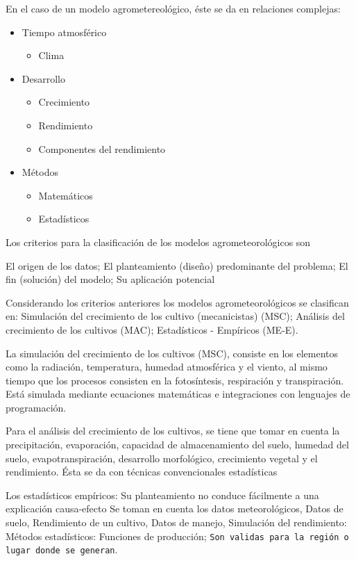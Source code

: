 En el caso de un modelo agrometereológico, éste se da en relaciones complejas:
\begin{itemize}
  \item Tiempo atmosférico \begin{itemize}
    \item Clima
  \end{itemize}
  \item Desarrollo \begin{itemize}
    \item Crecimiento
    \item Rendimiento
    \item Componentes del rendimiento
  \end{itemize}
  \item Métodos\begin{itemize}
    \item Matemáticos
    \item Estadísticos
  \end{itemize}
\end{itemize}

Los criterios para la clasificación de los modelos agrometeorológicos son 

El origen de los datos; El planteamiento (diseño) predominante del problema; El fin (solución) del modelo; Su aplicación potencial

Considerando los criterios anteriores los modelos agrometeorológicos se clasifican en: Simulación del crecimiento de los cultivo (mecanicistas) (MSC); Análisis del crecimiento de los cultivos (MAC); Estadísticos - Empíricos (ME-E).

La simulación del crecimiento de los cultivos (MSC), consiste en los elementos como la radiación, temperatura, humedad atmosférica y el viento, al mismo tiempo que los procesos consisten en la fotosíntesis, respiración y transpiración.
Está simulada mediante ecuaciones matemáticas e integraciones con lenguajes de programación.

Para el análisis del crecimiento de los cultivos, se tiene que tomar en cuenta la precipitación, evaporación, capacidad de almacenamiento del suelo, humedad del suelo, evapotranspiración, desarrollo morfológico, crecimiento vegetal y el rendimiento. Ésta se da con técnicas convencionales estadísticas

Los estadísticos empíricos: Su planteamiento no conduce fácilmente a una explicación causa-efecto
Se toman en cuenta los datos meteorológicos, Datos de suelo, Rendimiento de un cultivo, Datos de manejo, Simulación del rendimiento: Métodos estadísticos: Funciones de producción; \texttt{Son validas para la región o lugar donde se generan}.

